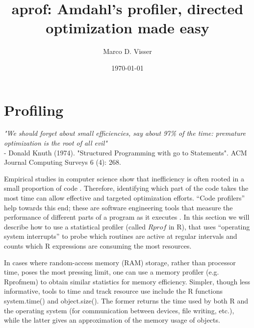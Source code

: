 \documentclass{article}\usepackage[]{graphicx}\usepackage[]{color}
\begin{document}

\title{aprof: Amdahl's profiler, directed optimization made easy}
\date{\today}
\author{Marco D. Visser}
\maketitle



\section{Profiling}
\label{profiling}
\textit{"We should forget about small efficiencies, say about 97\% of the time: premature optimization is the root of all evil"} \\
\newline
- Donald Knuth (1974). "Structured Programming with go to Statements". ACM Journal Computing Surveys 6 (4): 268.
\newline


Empirical studies in computer science show that inefficiency is often rooted in a small proportion of code \citep{Porter1990}.  Therefore, identifying which part of the code takes the most time can allow effective and targeted optimization efforts. “Code profilers” help towards this end; these are software engineering tools that measure the performance of different parts of a program as it executes \citep{Bryant2010}. In this section we will describe how to use a statistical profiler (called $Rprof$ in R), that uses “operating system interrupts” to probe which routines are active at regular intervals and counts which R expressions are consuming the most resources. 

In cases where random-access memory (RAM) storage, rather than processor time, poses the most pressing limit, one can use a memory profiler (e.g. Rprofmem) to obtain similar statistics for memory efficiency. Simpler, though less informative, tools to time and track resource use include the R functions system.time() and object.size(). The former returns the time used by both R and the operating system (for communication between devices, file writing, etc.), while the latter gives an approximation of the memory usage of objects.
\end{document}

